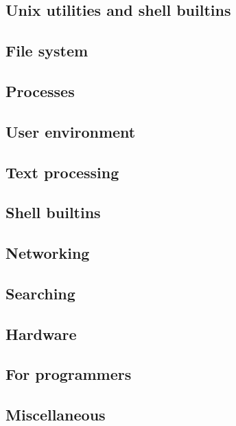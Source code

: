 \documentclass[a4paper, twoside, 8pt]{extarticle}
\begin{document}
\begin{multicols}{3}
\section{Unix utilities and shell builtins}

\subsection{File system}


\subsection{Processes}


\subsection{User environment}


\subsection{Text processing}


\subsection{Shell builtins}


\subsection{Networking}


\subsection{Searching}


\subsection{Hardware}


\subsection{For programmers}


\subsection{Miscellaneous}

\end{multicols}
\end{document}

